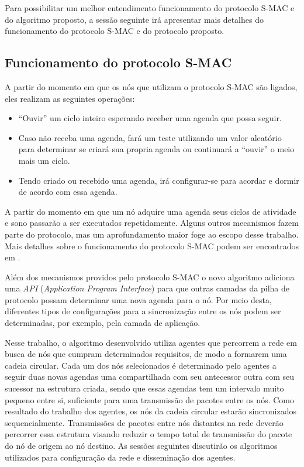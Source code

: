 Para possibilitar um melhor entendimento funcionamento do protocolo S-MAC e do algoritmo proposto, a sessão seguinte irá apresentar mais detalhes do funcionamento do protocolo S-MAC e do protocolo proposto.

\subsection{Funcionamento do protocolo S-MAC\cite{ye04}}

A partir do momento em que os nós que utilizam o protocolo S-MAC são ligados, eles realizam as seguintes operações:

\begin{itemize}
	\item ``Ouvir'' um ciclo inteiro esperando receber uma agenda que possa seguir.
	\item Caso não receba uma agenda, fará um teste utilizando um valor aleatório para determinar se criará sua propria agenda ou continuará a ``ouvir'' o meio mais um ciclo.
	\item Tendo criado ou recebido uma agenda, irá configurar-se para acordar e dormir de acordo com essa agenda.
\end{itemize}

A partir do momento em que um nó adquire uma agenda seus ciclos de atividade e sono passarão a ser executados repetidamente. Alguns outros mecanismos fazem parte do protocolo, mas um aprofundamento maior foge ao escopo desse trabalho. Mais detalhes sobre o funcionamento do protocolo S-MAC podem ser encontrados em \cite{ye04}. 

Além dos mecanismos providos pelo protocolo S-MAC o novo algoritmo adiciona uma \emph{API } (\emph{Application Program Interface}) para que outras camadas da pilha de protocolo possam determinar uma nova agenda para o nó. Por meio desta, diferentes tipos de configurações para a sincronização entre os nós podem ser determinadas, por exemplo, pela camada de aplicação.

Nesse trabalho, o algoritmo desenvolvido utiliza agentes que percorrem a rede em busca de nós que cumpram determinados requisitos, de modo a formarem uma cadeia circular. Cada um dos nós selecionados é determinado pelo agentes a seguir duas novas agendas uma compartilhada com seu antecessor outra com seu sucessor na estrutura criada, sendo que essas agendas tem um intervalo muito pequeno entre si, suficiente para uma transmissão de pacotes entre os nós. Como resultado do trabalho dos agentes, os nós da cadeia circular estarão sincronizados sequencialmente. Transmissões de pacotes entre nós distantes na rede deverão percorrer essa estrutura visando reduzir o tempo total de transmissão do pacote do nó de origem ao nó destino. As sessões seguintes discutirão os algoritmos utilizados para configuração da rede e disseminação dos agentes.

